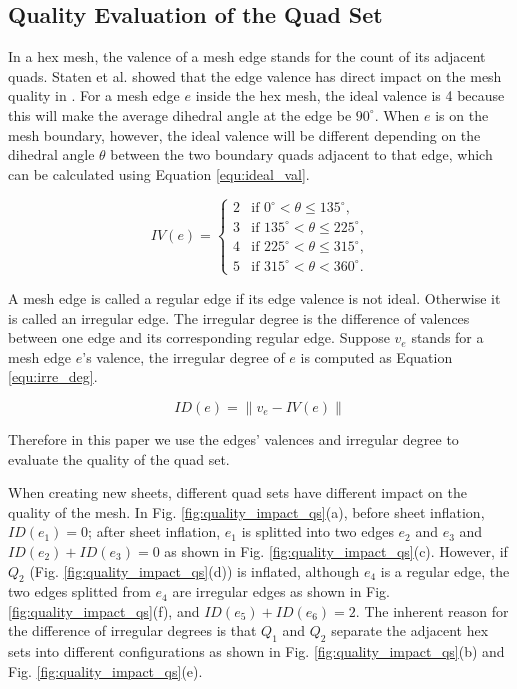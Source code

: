 \documentclass[final,5p,times,twocolumn]{elsarticle}
\begin{document}
\subsection{Quality Evaluation of the Quad Set}
\label{sec:quality_eval_qs}
In a hex mesh, the valence of a mesh edge stands for the count of its adjacent quads. Staten et al. showed that the edge valence has direct impact on the mesh quality in \cite{Staten2010d}. For a mesh edge $e$ inside the hex mesh, the ideal valence is 4 because this will make the average dihedral angle at the edge be $90^{\circ}$. When $e$ is on the mesh boundary, however, the ideal valence will be different depending on the dihedral angle $\theta$ between the two boundary quads adjacent to that edge, which can be calculated using Equation \ref{equ:ideal_val}.

\begin{equation}
\label{equ:ideal_val}
IV(e) =
 \begin{cases}
    2 & \text{if $0^{\circ} < \theta \leq 135^{\circ}$,} \\
    3 & \text{if $135^{\circ} < \theta \leq 225^{\circ}$,} \\
    4 & \text{if $225^{\circ} < \theta \leq 315^{\circ}$,} \\
    5 & \text{if $315^{\circ} < \theta < 360^{\circ}$.}
 \end{cases}
\end{equation}

A mesh edge is called a regular edge if its edge valence is not ideal. Otherwise it is called an irregular edge. The irregular degree is the difference of valences between one edge and its corresponding regular edge. Suppose $v_e$ stands for a mesh edge $e$'s valence, the irregular degree of $e$ is computed as Equation \ref{equ:irre_deg}.

\begin{equation}
\label{equ:irre_deg}
ID(e) = \left \| v_e-IV(e) \right \|
\end{equation}

Therefore in this paper we use the edges' valences and irregular degree to evaluate the quality of the quad set.

When creating new sheets, different quad sets have different impact on the quality of the mesh. In Fig. \ref{fig:quality_impact_qs}(a), before sheet inflation, $ID(e_1)=0$; after sheet inflation, $e_1$ is splitted into two edges $e_2$ and $e_3$ and $ID(e_2)+ID(e_3)=0$ as shown in Fig. \ref{fig:quality_impact_qs}(c). However, if $Q_2$ (Fig. \ref{fig:quality_impact_qs}(d)) is inflated, although $e_4$ is a regular edge, the two edges splitted from $e_4$ are irregular edges as shown in Fig. \ref{fig:quality_impact_qs}(f), and $ID(e_5)+ID(e_6)=2$. The inherent reason for the difference of irregular degrees is that $Q_1$ and $Q_2$ separate the adjacent hex sets into different configurations as shown in Fig. \ref{fig:quality_impact_qs}(b) and Fig. \ref{fig:quality_impact_qs}(e).
\end{document}
